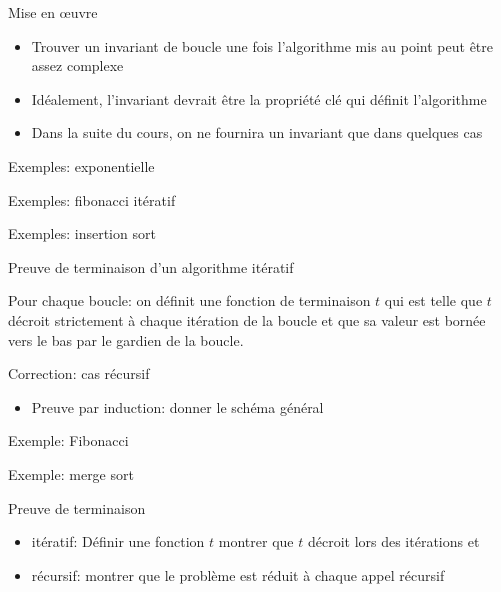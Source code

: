 \begin{frame}{Mise en \oe uvre}
\begin{itemize}
\item Trouver un invariant de boucle une fois l'algorithme mis au point peut être assez complexe
\item Idéalement, l'invariant devrait être la propriété clé qui définit l'algorithme
\item Dans la suite du cours, on ne fournira un invariant que dans quelques cas
\end{itemize}
\end{frame}
\begin{frame}{Exemples: exponentielle}
\end{frame}

\begin{frame}{Exemples: fibonacci itératif}
\end{frame}

\begin{frame}{Exemples: insertion sort}
\end{frame}

\begin{frame}{Preuve de terminaison d'un algorithme itératif}

Pour chaque boucle: on définit une fonction de terminaison $t$ qui est telle que $t$ décroit strictement à chaque itération de la boucle et que sa valeur est bornée vers le bas par le gardien de la boucle.

\end{frame}

\begin{frame}{Correction: cas récursif}
\begin{itemize}
\item Preuve par induction: donner le schéma général
\end{itemize}
\end{frame}

\begin{frame}{Exemple: Fibonacci}
\end{frame}

\begin{frame}{Exemple: merge sort}
\end{frame}

\begin{frame}{Preuve de terminaison}
\begin{itemize}
\item itératif: Définir une fonction $t$ montrer que $t$ décroit lors des itérations et 
\item récursif: montrer que le problème est réduit à chaque appel récursif
\end{itemize}
\end{frame}

